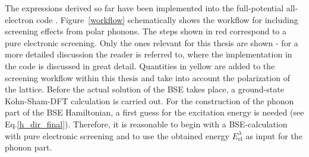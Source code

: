 The expressions derived so far have been implemented into the full-potential all-electron code \exciting{}\cite{exciting}. Figure~\ref{workflow} schematically shows the workflow for including screening effects from polar phonons. The steps shown in red correspond to a pure electronic screening. Only the ones relevant for this thesis are shown - for a more detailed discussion the reader is referred to\cite{Vorwerk_2019,exciting}, where the implementation in the code is discussed in great detail. Quantities in yellow are added to the screening workflow within this thesis and take into account the polarization of the lattice. Before the actual solution of the BSE takes place, a ground-state Kohn-Sham-DFT calculation is carried out. For the construction of the phonon part of the BSE Hamiltonian, a first guess for the excitation energy is needed (see Eq.\;\eqref{h_dir_final}). Therefore, it is reasonable to begin with a BSE-calculation with pure electronic screening and to use the obtained energy $E_\text{el}^\lambda$ as input for the phonon part.\par
%
